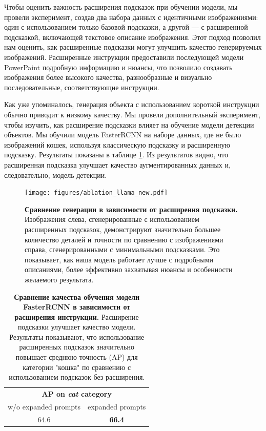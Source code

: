 \documentclass[11pt]{article}
\begin{document}
Чтобы оценить важность расширения подсказок при обучении модели, мы провели эксперимент, создав два набора данных с идентичными изображениями: один с использованием только базовой подсказки, а другой — с расширенной подсказкой, включающей текстовое описание изображения. Этот подход позволил нам оценить, как расширенные подсказки могут улучшить качество генерируемых изображений. Расширенные инструкции предоставили последующей модели PowerPaint подробную информацию и нюансы, что позволило создавать изображения более высокого качества, разнообразные и визуально последовательные, соответствующие инструкции.

Как уже упоминалось, генерация объекта с использованием короткой инструкции обычно приводит к низкому качеству. Мы провели дополнительный эксперимент, чтобы изучить, как расширение подсказки влияет на обучение модели детекции объектов. Мы обучили модель FasterRCNN на наборе данных, где не было изображений кошек, используя классическую подсказку и расширенную подсказку. Результаты показаны в таблице \ref{fig:expanding_prompts}. Из результатов видно, что расширенная подсказка улучшает качество аугментированных данных и, следовательно, модель детекции.

\begin{figure}[h]
    \centering
    \texttt{[image: figures/ablation\_llama\_new.pdf]}
    \caption{\textbf{Сравнение генерации в зависимости от расширения подсказки.} Изображения слева, сгенерированные с использованием расширенных подсказок, демонстрируют значительно большее количество деталей и точности по сравнению с изображениями справа, сгенерированными с минимальными подсказками. Это показывает, как наша модель работает лучше с подробными описаниями, более эффективно захватывая нюансы и особенности желаемого результата.}
    \label{fig:expanding_prompts}
\end{figure}

\begin{table}[h]
        \centering
        \begin{tabular}{cc}
                \toprule
                \multicolumn{2}{c}{\textbf{AP on \emph{cat} category}} \\
                w/o expanded prompts & expanded prompts   \\
                \midrule
                  64.6  &  \textbf{66.4} \\ %
                  \bottomrule
        \end{tabular}
        \caption{\textbf{Сравнение качества обучения модели FasterRCNN в зависимости от расширения инструкции.} Расширение подсказки улучшает качество модели. Результаты показывают, что использование расширенных подсказок значительно повышает среднюю точность (AP) для категории "кошка" по сравнению с использованием подсказок без расширения.}
        \label{tab:prompt_expanding}
        
\end{table}
\end{document}
